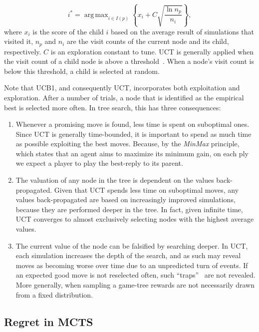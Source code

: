\documentclass{kecsmstr}
\DeclareMathOperator*{\argmax}{arg\,max}
\begin{document}
\begin{equation}
\label{eq:uct}
i^* = \argmax_{i \in I(p)}\left\{ x_i + C \sqrt{ \frac{\ln{n_p}}{n_i}}\right\},
\end{equation}
where $x_i$ is the score of the child $i$ based on the average result of simulations that visited it, $n_p$ and $n_i$ are the visit counts of the current node and its child, respectively. $C$ is an exploration constant to tune. UCT is generally applied when the visit count of a child node is above a threshold~. When a node's visit count is below this threshold, a child is selected at random.

Note that UCB1, and consequently UCT, incorporates both exploitation and exploration. After a number of trials, a node that is identified as the empirical best is selected more often. In tree search, this has three consequences:
\begin{enumerate} 
\item Whenever a promising move is found, less time is spent on suboptimal ones. Since UCT is generally time-bounded, it is important to spend as much time as possible exploiting the best moves. Because, by the \emph{MinMax} principle, which states that an agent aims to maximize its minimum gain, on each ply we expect a player to play the best-reply to its parent. 

\item The valuation of any node in the tree is dependent on the values back-propagated. Given that UCT spends less time on suboptimal moves, any values back-propagated are based on increasingly improved simulations, because they are performed deeper in the tree. In fact, given infinite time, UCT converges to almost exclusively selecting nodes with the highest average values.

\item The current value of the node can be falsified by searching deeper. In UCT, each simulation increases the depth of the search, and as such may reveal moves as becoming worse over time due to an unpredicted turn of events. If an expected good move is not reselected often, such ``traps''~ are not revealed. More generally, when sampling a game-tree rewards are not necessarily drawn from a fixed distribution.
\end{enumerate}
\newpage
\subsection{Regret in MCTS}
\end{document}
